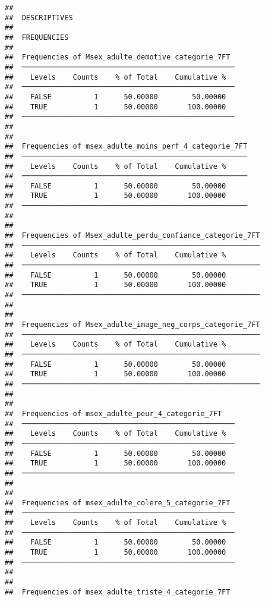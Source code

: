 \documentclass[
]{article}
\begin{document}
\begin{verbatim}
## 
##  DESCRIPTIVES
## 
##  FREQUENCIES
## 
##  Frequencies of Msex_adulte_demotive_categorie_7FT  
##  ────────────────────────────────────────────────── 
##    Levels    Counts    % of Total    Cumulative %   
##  ────────────────────────────────────────────────── 
##    FALSE          1      50.00000        50.00000   
##    TRUE           1      50.00000       100.00000   
##  ────────────────────────────────────────────────── 
## 
## 
##  Frequencies of msex_adulte_moins_perf_4_categorie_7FT 
##  ───────────────────────────────────────────────────── 
##    Levels    Counts    % of Total    Cumulative %   
##  ───────────────────────────────────────────────────── 
##    FALSE          1      50.00000        50.00000   
##    TRUE           1      50.00000       100.00000   
##  ───────────────────────────────────────────────────── 
## 
## 
##  Frequencies of Msex_adulte_perdu_confiance_categorie_7FT 
##  ──────────────────────────────────────────────────────── 
##    Levels    Counts    % of Total    Cumulative %   
##  ──────────────────────────────────────────────────────── 
##    FALSE          1      50.00000        50.00000   
##    TRUE           1      50.00000       100.00000   
##  ──────────────────────────────────────────────────────── 
## 
## 
##  Frequencies of Msex_adulte_image_neg_corps_categorie_7FT 
##  ──────────────────────────────────────────────────────── 
##    Levels    Counts    % of Total    Cumulative %   
##  ──────────────────────────────────────────────────────── 
##    FALSE          1      50.00000        50.00000   
##    TRUE           1      50.00000       100.00000   
##  ──────────────────────────────────────────────────────── 
## 
## 
##  Frequencies of msex_adulte_peur_4_categorie_7FT    
##  ────────────────────────────────────────────────── 
##    Levels    Counts    % of Total    Cumulative %   
##  ────────────────────────────────────────────────── 
##    FALSE          1      50.00000        50.00000   
##    TRUE           1      50.00000       100.00000   
##  ────────────────────────────────────────────────── 
## 
## 
##  Frequencies of msex_adulte_colere_5_categorie_7FT  
##  ────────────────────────────────────────────────── 
##    Levels    Counts    % of Total    Cumulative %   
##  ────────────────────────────────────────────────── 
##    FALSE          1      50.00000        50.00000   
##    TRUE           1      50.00000       100.00000   
##  ────────────────────────────────────────────────── 
## 
## 
##  Frequencies of msex_adulte_triste_4_categorie_7FT  

\end{verbatim}
\end{document}
